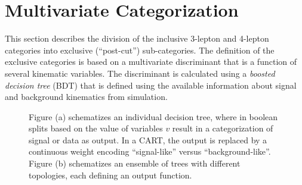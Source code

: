\section{Multivariate Categorization}\label{sec:hmmBdt}

This section describes the division of the inclusive 3-lepton and 4-lepton categories into exclusive (``post-cut'') sub-categories.
The definition of the exclusive categories is based on a multivariate discriminant that is a function of several kinematic variables.
The discriminant is calculated using a \emph{boosted decision tree} (BDT) that is defined using the available information about signal and background kinematics from simulation.

\begin{figure}[h!]
\captionsetup[subfigure]{position=b}
\centering
{}
\caption{Figure (a) schematizes an individual decision tree, where in boolean splits based on the value of variables $v$ result in a categorization of signal or data as output. In a CART, the output is replaced by a continuous weight encoding ``signal-like'' versus ``background-like''. Figure (b) schematizes an ensemble of trees with different topologies, each defining an output function.}
\label{fig:}
\end{figure}

